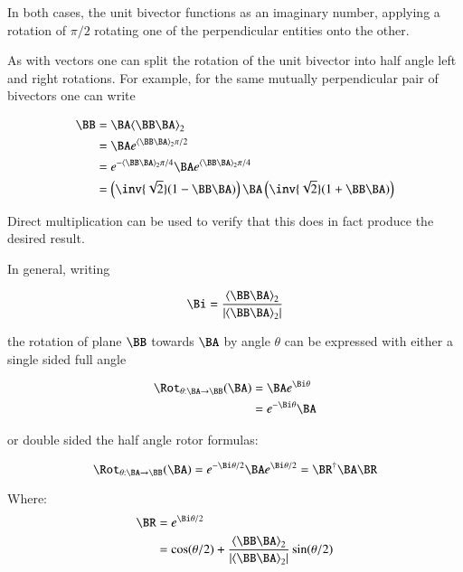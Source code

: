 In both cases, the unit bivector functions as an imaginary number, applying a rotation of $\pi/2$ rotating one of the perpendicular entities onto the other.

As with vectors one can split the rotation of the unit bivector into half angle left and right rotations.  For example, for the same mutually perpendicular pair of bivectors one can write

\begin{align*}
\BB 
&= \BA\gpgradetwo{\BB \BA} \\
&= \BA e^{\gpgradetwo{\BB \BA}\pi/2} \\
&= e^{-\gpgradetwo{\BB \BA}\pi/4} \BA e^{\gpgradetwo{\BB \BA}\pi/4} \\
&= \left(\inv{\sqrt{2}}(1 - \BB \BA)\right) \BA \left(\inv{\sqrt{2}}(1 + \BB \BA) \right) \\
\end{align*}

Direct multiplication can be used to verify that this does in fact produce the desired result.

In general, writing 

\begin{align*}
\Bi = \frac{\gpgradetwo{\BB \BA}}{\Abs{\gpgradetwo{\BB \BA}}}
\end{align*}

the rotation of plane $\BB$ towards $\BA$ by angle $\theta$ can be expressed with either a single sided full angle

\begin{align*}
\Rot_{\theta: \BA \rightarrow \BB}(\BA) 
&= \BA e^{\Bi \theta} \\
&= e^{-\Bi \theta} \BA \\
\end{align*}

or double sided the half angle rotor formulas:

\begin{equation}
\label{eqn:bivector:rotor}
\Rot_{\theta: \BA \rightarrow \BB}(\BA) = e^{-\Bi \theta/2} \BA e^{\Bi \theta/2} = \BR^\dagger \BA \BR
\end{equation}

Where:
\begin{align*}
\BR 
&= e^{\Bi\theta/2} \\
&= \cos(\theta/2) + \frac{\gpgradetwo{\BB \BA}}{\Abs{\gpgradetwo{\BB \BA}}}\sin(\theta/2) \\
\end{align*}

